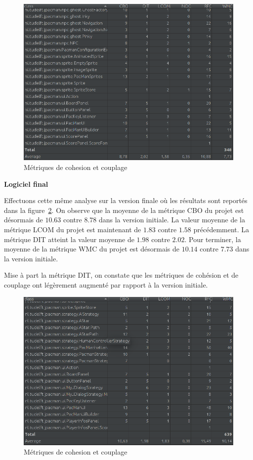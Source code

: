 \documentclass[12pt, openany]{report}
\begin{document}
\begin{figure}[!h]
	\centering
	\includegraphics[scale=0.6]{Images/MetricsCohesion1.png} 
	\caption{Métriques de cohesion et couplage}
	\label{MetricsCohesion1}
\end{figure}

\newpage
\textbf{Logiciel final}

Effectuons cette même analyse sur la version finale où les résultats sont reportés dans la figure~\ref{MetricsCohesion2}. On observe que la moyenne de la métrique CBO du projet est désormais de $10.63$ contre $8.78$ dans la version initiale. La valeur moyenne de la métrique LCOM du projet est maintenant de $1.83$ contre $1.58$ précédemment. La métrique DIT atteint la valeur moyenne de $1.98$ contre $2.02$. Pour terminer, la moyenne de la métrique WMC du projet est désormais de $10.14$ contre $7.73$ dans la version initiale.

Mise à part la métrique DIT, on constate que les métriques de cohésion et de couplage ont légèrement augmenté par rapport à la version initiale.

\begin{figure}[!h]
	\centering
	\includegraphics[scale=0.6]{Images/MetricsCohesion2.png} 
	\caption{Métriques de cohesion et couplage}
	\label{MetricsCohesion2}
\end{figure}
\end{document}
